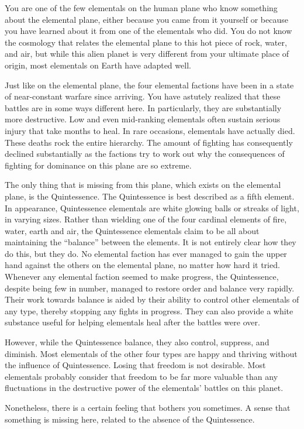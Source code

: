 \documentclass[blue]{elementals}
\begin{document}
\name{\bKnowQ{}}

You are one of the few elementals on the human plane who know something about the elemental plane, either because you came from it yourself or because you have learned about it from one of the elementals who did.  You do not know the cosmology that relates the elemental plane to this hot piece of rock, water, and air, but while this alien planet is very different from your ultimate place of origin, most elementals on Earth have adapted well.

Just like on the elemental plane, the four elemental factions have been in a state of near-constant warfare since arriving.  You have astutely realized that these battles are in some ways different here.  In particularly, they are substantially more destructive.  Low and even mid-ranking elementals often sustain serious injury that take months to heal.  In rare occasions, elementals have actually died.  These deaths rock the entire hierarchy.  The amount of fighting has consequently declined substantially as the factions try to work out why the consequences of fighting for dominance on this plane are so extreme.

The only thing that is missing from this plane, which exists on the elemental plane, is the Quintessence.  The Quintessence is best described as a fifth element.  In appearance, Quintessence elementals are white glowing balls or streaks of light, in varying sizes.  Rather than wielding one of the four cardinal elements of fire, water, earth and air, the Quintessence elementals claim to be all about maintaining the ``balance'' between the elements.  It is not entirely clear how they do this, but they do.  No elemental faction has ever managed to gain the upper hand against the others on the elemental plane, no matter how hard it tried.  Whenever any elemental faction seemed to make progress, the Quintessence, despite being few in number, managed to restore order and balance very rapidly.  Their work towards balance is aided by their ability to control other elementals of any type, thereby stopping any fights in progress.  They can also provide a white substance useful for helping elementals heal after the battles were over.

However, while the Quintessence balance, they also control, suppress, and diminish.  Most elementals of the other four types are happy and thriving without the influence of Quintessence.  Losing that freedom is not desirable.  Most elementals probably consider that freedom to be far more valuable than any fluctuations in the destructive power of the elementals' battles on this planet.

Nonetheless, there is a certain feeling that bothers you sometimes.  A sense that something is missing here, related to the absence of the Quintessence.
\end{document}
